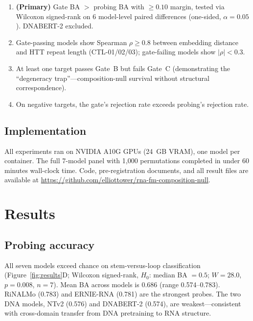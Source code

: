 \documentclass[11pt]{article}
\begin{document}
\begin{enumerate}[label=\textbf{H-E\arabic*}]
\item \textbf{(Primary)} Gate BA $>$ probing BA with $\geq 0.10$ margin,
  tested via Wilcoxon signed-rank on 6 model-level paired differences
  (one-sided, $\alpha = 0.05$). DNABERT-2 excluded.
\item Gate-passing models show Spearman $\rho \geq 0.8$ between embedding
  distance and HTT repeat length (CTL-01/02/03); gate-failing models show
  $|\rho| < 0.3$.
\item At least one target passes Gate~B but fails Gate~C (demonstrating the
  ``degeneracy trap''---composition-null survival without structural
  correspondence).
\item On negative targets, the gate's rejection rate exceeds probing's
  rejection rate.
\end{enumerate}

\subsection{Implementation}

All experiments ran on NVIDIA A10G GPUs (24~GB VRAM), one model per
container. The full 7-model panel with 1,000 permutations completed in
under 60 minutes wall-clock time. Code, pre-registration documents,
and all result files are available at
\url{https://github.com/elliottower/rna-fm-composition-null}.


\section{Results}

\subsection{Probing accuracy}

All seven models exceed chance on stem-versus-loop classification
(Figure~\ref{fig:results}D; Wilcoxon
signed-rank, $H_0$: median BA $= 0.5$; $W = 28.0$, $p = 0.008$, $n = 7$).
Mean BA across models is 0.686 (range 0.574--0.783). RiNALMo (0.783) and
ERNIE-RNA (0.781) are the strongest probes. The two DNA models, NTv2 (0.576)
and DNABERT-2 (0.574), are weakest---consistent with cross-domain transfer
from DNA pretraining to RNA structure.
\end{document}
